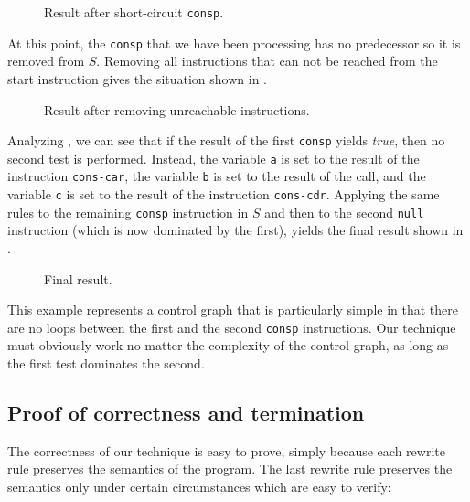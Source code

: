 \begin{figure}
\begin{center}
\end{center}
\caption{\label{fig-rewrite-6}
Result after short-circuit \texttt{consp}.}
\end{figure}

At this point, the \texttt{consp} that we have been processing has no
predecessor so it is removed from $S$.  Removing all instructions that
can not be reached from the start instruction gives the situation
shown in .

\begin{figure}
\begin{center}
\end{center}
\caption{\label{fig-rewrite-7}
Result after removing unreachable instructions.}
\end{figure}

Analyzing , we can see that if the result of the
first \texttt{consp} yields \emph{true}, then no second test is
performed.  Instead, the variable \texttt{a} is set to the result of
the instruction \texttt{cons-car}, the variable \texttt{b} is set to
the result of the call, and the variable \texttt{c} is set to the
result of the instruction \texttt{cons-cdr}.  Applying the same rules
to the remaining \texttt{consp} instruction in $S$ and then to the
second \texttt{null} instruction (which is now dominated by the
first), yields the final result shown in  .

\begin{figure}
\begin{center}
\end{center}
\caption{\label{fig-rewrite-8}
Final result.}
\end{figure}

This example represents a control graph that is particularly simple in
that there are no loops between the first and the second
\texttt{consp} instructions.  Our technique must obviously work no
matter the complexity of the control graph, as long as the first test
dominates the second.

\subsection{Proof of correctness and termination}

The correctness of our technique is easy to prove, simply because each
rewrite rule preserves the semantics of the program.  The last rewrite
rule preserves the semantics only under certain circumstances which
are easy to verify:

